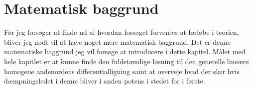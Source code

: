 \chapter{Matematisk baggrund}
Før jeg forsøger at finde ud af hvordan forsøget forventes at forløbe i teorien, bliver jeg nødt til at have noget mere matematisk baggrund. 
Det er denne matematiske baggrund jeg vil forsøge at introducere i dette kapitel. 
Målet med hele kapitlet er at kunne finde den fuldstændige løsning til den generelle lineære homogene andenordens differentialligning samt at overveje hvad der sker hvis dæmpningsledet i denne bliver i anden potens i stedet for i første. 